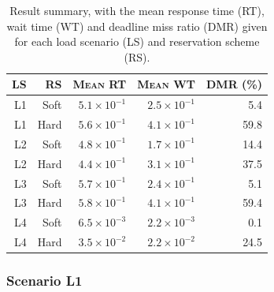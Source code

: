 \documentclass[times, 10pt,twocolumn]{article}
\begin{document}
\begin{table}[ht]
  \centering
  \begin{tabular}[t]{rrrrr} \hline
    \textsc{LS} & \textsc{RS} & \textsc{Mean RT} & \textsc{Mean WT} & \textsc{DMR (\%)} \\ \hline
    L1 & Soft & $5.1\times 10^{-1}$   & $2.5\times 10^{-1}$   & 5.4  \\
    L1 & Hard & $5.6\times 10^{-1}$   & $4.1\times 10^{-1}$   & 59.8 \\
    L2 & Soft & $4.8\times 10^{-1}$   & $1.7\times 10^{-1}$   & 14.4 \\
    L2 & Hard & $4.4\times 10^{-1}$   & $3.1\times 10^{-1}$   & 37.5 \\
    L3 & Soft & $5.7\times 10^{-1}$   & $2.4\times 10^{-1}$   & 5.1  \\
    L3 & Hard & $5.8\times 10^{-1}$   & $4.1\times 10^{-1}$   & 59.4 \\
    L4 & Soft & $6.5\times 10^{-3}$   & $2.2\times 10^{-3}$   & 0.1  \\
    L4 & Hard & $3.5\times 10^{-2}$   & $2.2\times 10^{-2}$   & 24.5 \\ \hline    
  \end{tabular}
  \caption{Result summary, with the mean response time (RT), wait time
  (WT) and deadline miss ratio (DMR) given for each load scenario (LS)
  and reservation scheme (RS).}
  \label{tab:summary}
\end{table}

\subsubsection{Scenario L1}
\label{sec:scenario-l1}
\end{document}
